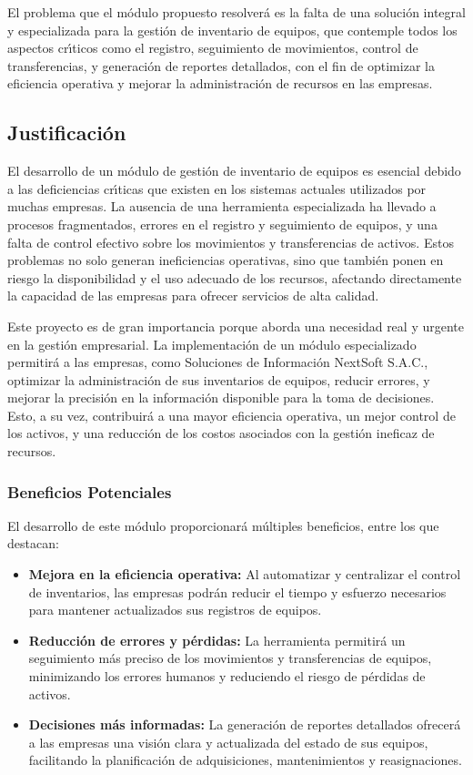 \documentclass[stu, 12pt, letterpaper, donotrepeattitle, floatsintext, natbib]{apa7}
\begin{document}
El problema que el m\'odulo propuesto resolver\'a es la falta de una soluci\'on integral y especializada para la gesti\'on de inventario de equipos, que contemple
todos los aspectos cr\'{\i}ticos como el registro, seguimiento de movimientos, control de transferencias, y generaci\'on de reportes detallados, con el fin de
optimizar la eficiencia operativa y mejorar la administraci\'on de recursos en las empresas.
\subsection{Justificaci\'on}
El desarrollo de un m\'odulo de gesti\'on de inventario de equipos es esencial debido a las deficiencias cr\'{\i}ticas que existen en los sistemas actuales
utilizados por muchas empresas. La ausencia de una herramienta especializada ha llevado a procesos fragmentados, errores en el registro y seguimiento de equipos, y
una falta de control efectivo sobre los movimientos y transferencias de activos. Estos problemas no solo generan ineficiencias operativas, sino que tambi\'en ponen
en riesgo la disponibilidad y el uso adecuado de los recursos, afectando directamente la capacidad de las empresas para ofrecer servicios de alta calidad.

Este proyecto es de gran importancia porque aborda una necesidad real y urgente en la gesti\'on empresarial. La implementaci\'on de un m\'odulo especializado
permitir\'a a las empresas, como Soluciones de Informaci\'on NextSoft S.A.C., optimizar la administraci\'on de sus inventarios de equipos, reducir errores, y
mejorar la precisi\'on en la informaci\'on disponible para la toma de decisiones. Esto, a su vez, contribuir\'a a una mayor eficiencia operativa, un mejor control
de los activos, y una reducci\'on de los costos asociados con la gesti\'on ineficaz de recursos.
\subsubsection{Beneficios Potenciales}
El desarrollo de este m\'odulo proporcionar\'a m\'ultiples beneficios, entre los que destacan:
\begin{itemize}
    \item\textbf{Mejora en la eficiencia operativa:} Al automatizar y centralizar el control de inventarios, las empresas podr\'an reducir el tiempo y esfuerzo
          necesarios para mantener actualizados sus registros de equipos.
    \item\textbf{Reducci\'on de errores y p\'erdidas:} La herramienta permitir\'a un seguimiento m\'as preciso de los movimientos y transferencias de equipos,
          minimizando los errores humanos y reduciendo el riesgo de p\'erdidas de activos.
    \item\textbf{Decisiones m\'as informadas:} La generaci\'on de reportes detallados ofrecer\'a a las empresas una visi\'on clara y actualizada del estado de
          sus equipos, facilitando la planificaci\'on de adquisiciones, mantenimientos y reasignaciones.
\end{itemize}
\end{document}
